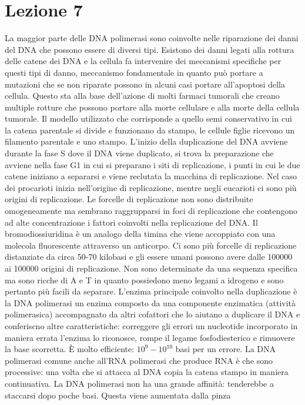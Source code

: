 \section{Lezione 7}
La maggior parte delle DNA polimerasi sono coinvolte nelle riparazione dei danni del DNA che possono essere di diversi tipi. Esistono dei danni legati alla rottura delle catene dei
DNA e la cellula fa intervenire dei meccanismi specifiche per questi tipi di danno, meccanismo fondamentale in quanto pu\`o portare a mutazioni che se non riparate possono in alcuni 
casi portare all'apoptosi della cellula. Questo sta alla base dell'azione di molti farmaci tumorali che creano multiple rotture che possono portare alla morte cellulare e alla morte della
cellula tumorale. Il modello utilizzato che corrisponde a quello semi conservativo in cui la catena parentale si divide e funzionano da stampo, le cellule figlie ricevono un filamento
parentale e uno stampo. L'inizio della duplicazione del DNA avviene durante la fase S dove il DNA viene duplicato, si trova la preparazione che avviene nella fase G1 in cui si preparano
i siti di replicazione, i punti in cui le due catene iniziano a separarsi e viene reclutata la macchina di replicazione. Nel caso dei procarioti inizia nell'origine di replicazione, 
mentre negli eucarioti ci sono pi\`u origini di replicazione. Le forcelle di replicazione non sono distribuite omogeneamente ma sembrano raggrupparsi in foci di replicazione che
contengono ad alte concentrazione i fattori coinvolti nella replicazione del DNA. Il bromodiossiuridina \`e un analogo della timina che viene accoppiato con una molecola fluorescente 
attraverso un anticorpo. Ci sono pi\`u forcelle di replicazione distanziate da circa 50-70 kilobasi e gli essere umani possono avere dalle 100000 ai 100000 origini di replicazione. Non
sono determinate da una sequenza specifica ma sono ricche di A e T in quanto possiedono meno legami a idrogeno e sono pertanto pi\`u facili da separare. L'enzima principale coinvolto
nella duplicazione \`e la DNA polimerasi un enzima composto da una componente enzimatica (attivit\`a polimerasica) accompagnato da altri cofattori che lo aiutano a duplicare il DNA
e conferiscno altre caratteristiche: correggere gli errori un nucleotide incorporato in maniera errata l'enzima lo riconosce, rompe il legame fosfodiesterico e rimuovere la base 
scorretta. \`E molto efficiente: $10^9 - 10^{10}$ basi per un errore. La DNA polimerasi comune anche all'RNA polimerasi che produce RNA \`e che sono processive: una volta che si attacca
al DNA copia la catena stampo in maniera continuativa. La DNA polimerasi non ha una grande affinit\`a: tenderebbe a staccarsi dopo poche basi. Questa viene aumentata dalla pinza 
